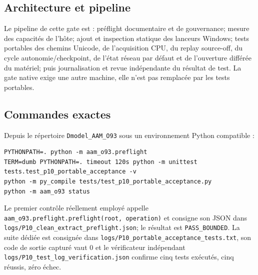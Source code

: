\documentclass[11pt,a4paper,oneside]{report}
\begin{document}
\subsection*{Architecture et pipeline}
Le pipeline de cette gate est : préflight documentaire et de gouvernance; mesure des capacités de l'hôte; ajout et inspection statique des lanceurs Windows; tests portables des chemins Unicode, de l'acquisition CPU, du replay source-off, du cycle autonomie/checkpoint, de l'état réseau par défaut et de l'ouverture différée du matériel; puis journalisation et revue indépendante du résultat de test. La gate native exige une autre machine, elle n'est pas remplacée par les tests portables.

\subsection*{Commandes exactes}
Depuis le répertoire \texttt{Dmodel\_AAM\_O93} sous un environnement Python compatible :
\begin{lstlisting}[basicstyle=\ttfamily\small,breaklines=true]
PYTHONPATH=. python -m aam_o93.preflight
TERM=dumb PYTHONPATH=. timeout 120s python -m unittest tests.test_p10_portable_acceptance -v
python -m py_compile tests/test_p10_portable_acceptance.py
python -m aam_o93 status
\end{lstlisting}
Le premier contrôle réellement employé appelle \texttt{aam\_o93.preflight.preflight(root, operation)} et consigne son JSON dans \texttt{logs/P10\_clean\_extract\_preflight.json}; le résultat est \texttt{PASS\_BOUNDED}. La suite dédiée est consignée dans \texttt{logs/P10\_portable\_acceptance\_tests.txt}, son code de sortie capturé vaut 0 et le vérificateur indépendant \texttt{logs/P10\_test\_log\_verification.json} confirme cinq tests exécutés, cinq réussis, zéro échec.
\end{document}
